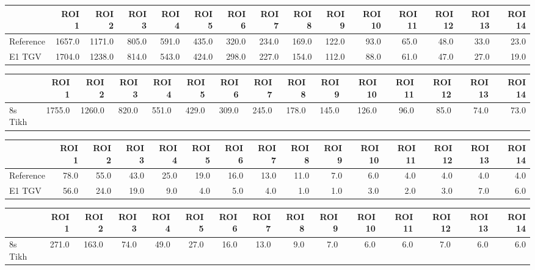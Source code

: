 \begin{tabular}{lrrrrrrrrrrrrrr}
\toprule
{} &   ROI 1 &   ROI 2 &  ROI 3 &  ROI 4 &  ROI 5 &  ROI 6 &  ROI 7 &  ROI 8 &  ROI 9 &  ROI 10 &  ROI 11 &  ROI 12 &  ROI 13 &  ROI 14 \\
\midrule
Reference &  1657.0 &  1171.0 &  805.0 &  591.0 &  435.0 &  320.0 &  234.0 &  169.0 &  122.0 &    93.0 &    65.0 &    48.0 &    33.0 &    23.0 \\
E1 TGV    &  1704.0 &  1238.0 &  814.0 &  543.0 &  424.0 &  298.0 &  227.0 &  154.0 &  112.0 &    88.0 &    61.0 &    47.0 &    27.0 &    19.0 \\
\bottomrule
\end{tabular}
\begin{tabular}{lrrrrrrrrrrrrrr}
\toprule
{} &   ROI 1 &   ROI 2 &  ROI 3 &  ROI 4 &  ROI 5 &  ROI 6 &  ROI 7 &  ROI 8 &  ROI 9 &  ROI 10 &  ROI 11 &  ROI 12 &  ROI 13 &  ROI 14 \\
\midrule
8s Tikh &  1755.0 &  1260.0 &  820.0 &  551.0 &  429.0 &  309.0 &  245.0 &  178.0 &  145.0 &   126.0 &    96.0 &    85.0 &    74.0 &    73.0 \\
\bottomrule
\end{tabular}
\begin{tabular}{lrrrrrrrrrrrrrr}
\toprule
{} &  ROI 1 &  ROI 2 &  ROI 3 &  ROI 4 &  ROI 5 &  ROI 6 &  ROI 7 &  ROI 8 &  ROI 9 &  ROI 10 &  ROI 11 &  ROI 12 &  ROI 13 &  ROI 14 \\
\midrule
Reference &   78.0 &   55.0 &   43.0 &   25.0 &   19.0 &   16.0 &   13.0 &   11.0 &    7.0 &     6.0 &     4.0 &     4.0 &     4.0 &     4.0 \\
E1 TGV    &   56.0 &   24.0 &   19.0 &    9.0 &    4.0 &    5.0 &    4.0 &    1.0 &    1.0 &     3.0 &     2.0 &     3.0 &     7.0 &     6.0 \\
\bottomrule
\end{tabular}
\begin{tabular}{lrrrrrrrrrrrrrr}
\toprule
{} &  ROI 1 &  ROI 2 &  ROI 3 &  ROI 4 &  ROI 5 &  ROI 6 &  ROI 7 &  ROI 8 &  ROI 9 &  ROI 10 &  ROI 11 &  ROI 12 &  ROI 13 &  ROI 14 \\
\midrule
8s Tikh &  271.0 &  163.0 &   74.0 &   49.0 &   27.0 &   16.0 &   13.0 &    9.0 &    7.0 &     6.0 &     6.0 &     7.0 &     6.0 &     6.0 \\
\bottomrule
\end{tabular}
